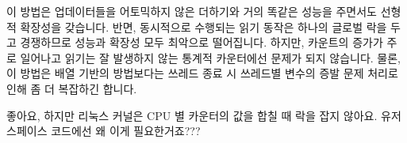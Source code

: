 이 방법은 업데이터들을 어토믹하지 않은 더하기와 거의 똑같은 성능을 주면서도
선형적 확장성을 갖습니다.
반면, 동시적으로 수행되는 읽기 동작은 하나의 글로벌 락을 두고 경쟁하므로 성능과
확장성 모두 최악으로 떨어집니다.
하지만, 카운트의 증가가 주로 일어나고 읽기는 잘 발생하지 않는 통계적 카운터에선
문제가 되지 않습니다.
물론, 이 방법은 배열 기반의 방법보다는 쓰레드 종료 시 쓰레드별 변수의 증발 문제
처리로 인해 좀 더 복잡하긴 합니다.

\QuickQuiz{}
	좋아요, 하지만 리눅스 커널은 CPU 별 카운터의 값을 합칠 때 락을 잡지
	않아요.
	유저 스페이스 코드에선 왜 이게 필요한거죠???
	\iffalse

